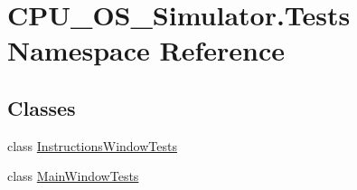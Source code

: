 \hypertarget{namespace_c_p_u___o_s___simulator_1_1_tests}{}\section{C\+P\+U\+\_\+\+O\+S\+\_\+\+Simulator.\+Tests Namespace Reference}
\label{namespace_c_p_u___o_s___simulator_1_1_tests}
\subsection*{Classes}
\begin{DoxyCompactItemize}
\item 
class \hyperlink{class_c_p_u___o_s___simulator_1_1_tests_1_1_instructions_window_tests}{Instructions\+Window\+Tests}
\item 
class \hyperlink{class_c_p_u___o_s___simulator_1_1_tests_1_1_main_window_tests}{Main\+Window\+Tests}
\end{DoxyCompactItemize}
